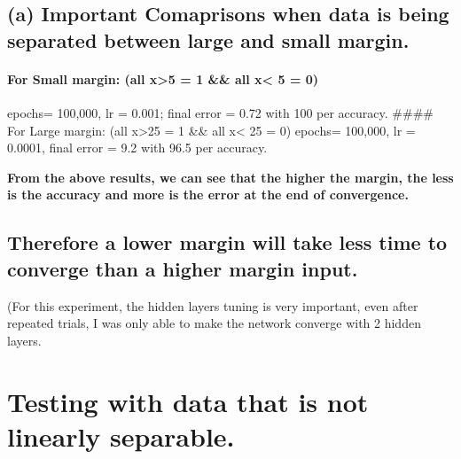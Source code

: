 \documentclass[11pt]{article}
\begin{document}
    \subsection{(a) Important Comaprisons when data is being separated
between large and small
margin.}\label{a-important-comaprisons-when-data-is-being-separated-between-large-and-small-margin.}

\paragraph{For Small margin: (all x\textgreater{}5 = 1 \&\& all
x\textless{} 5 = 0)}\label{for-small-margin-all-x5-1-all-x-5-0}

epochs= 100,000, lr = 0.001; final error = 0.72 with 100 per accuracy.
\#\#\#\# For Large margin: (all x\textgreater{}25 = 1 \&\& all
x\textless{} 25 = 0) epochs= 100,000, lr = 0.0001, final error = 9.2
with 96.5 per accuracy.

\textbf{From the above results, we can see that the higher the margin,
the less is the accuracy and more is the error at the end of
convergence.}

\subsection{Therefore a lower margin will take less time to converge
than a higher margin
input.}\label{therefore-a-lower-margin-will-take-less-time-to-converge-than-a-higher-margin-input.}

(For this experiment, the hidden layers tuning is very important, even
after repeated trials, I was only able to make the network converge with
2 hidden layers.

    \section{Testing with data that is not linearly
separable.}\label{testing-with-data-that-is-not-linearly-separable.}
\end{document}
